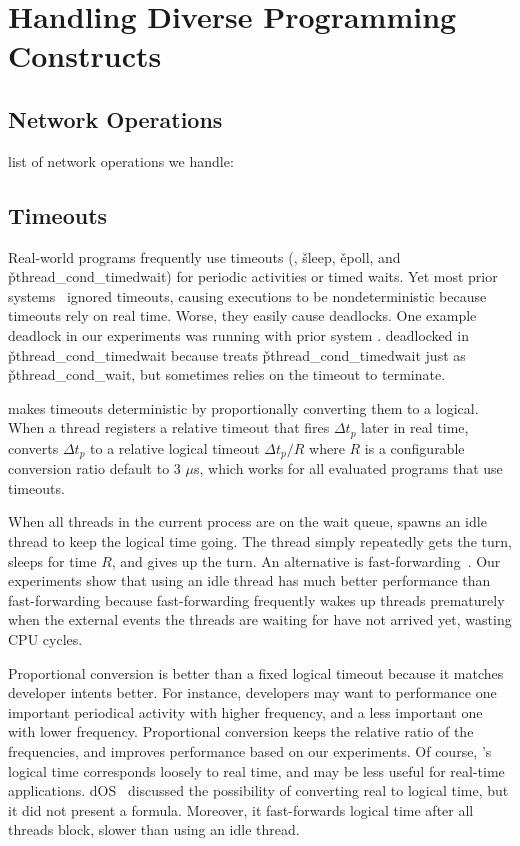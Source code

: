 \section{Handling Diverse Programming Constructs}

\subsection{Network Operations}

list of network operations we handle:

\subsection{Timeouts} \label{sec:timeout}

Real-world programs frequently use timeouts (\eg, \v{sleep}, \v{epoll},
and \v{pthread\_cond\_timedwait}) for periodic activities or timed waits.
Yet most prior systems~\cite{xxx} ignored timeouts, causing executions to
be nondeterministic because timeouts rely on real time.  Worse, they
easily cause deadlocks.  One example deadlock in our experiments was
running \pbzip with prior system \dthreads.  \pbzip deadlocked in
\v{pthread\_cond\_timedwait} because \dthreads treats
\v{pthread\_cond\_timedwait} just as \v{pthread\_cond\_wait}, but \pbzip
sometimes relies on the timeout to terminate.

\parrot makes timeouts deterministic by proportionally converting them to a
logical.  When a thread registers a relative timeout that fires $\Delta
t_p$ later in real time, \parrot converts $\Delta t_p$ to a relative logical
timeout $\Delta t_p /R$ where $R$ is a configurable conversion ratio
default to 3 $\mu$s, which works for all evaluated programs that use
timeouts.

When all threads in the current process are on the wait queue, \parrot spawns
an idle thread to keep the logical time going. The thread simply
repeatedly gets the turn, sleeps for time $R$, and gives up the turn.  An
alternative is fast-forwarding~\cite{modist:nsdi09}.  Our experiments show
that using an idle thread has much better performance than fast-forwarding
because fast-forwarding frequently wakes up threads prematurely when the
external events the threads are waiting for have not arrived yet, wasting
CPU cycles.

Proportional conversion is better than a fixed logical timeout because it
matches developer intents better.  For instance, developers may want to
performance one important periodical activity with higher frequency, and a
less important one with lower frequency.  Proportional conversion keeps
the relative ratio of the frequencies, and improves performance based on
our experiments.  Of course, \parrot's logical time corresponds loosely to
real time, and may be less useful for real-time applications.
dOS~\cite{dos:osdi10} discussed the possibility of converting real to
logical time, but it did not present a formula.  Moreover, it
fast-forwards logical time after all threads block, slower than using an
idle thread.

